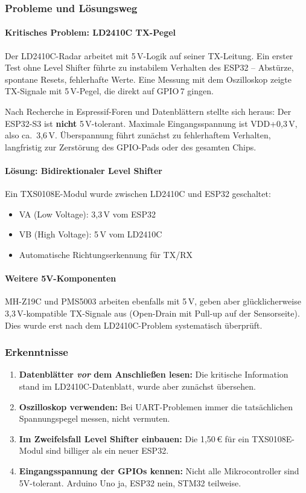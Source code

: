 \subsubsection{Probleme und Lösungsweg}

\paragraph{Kritisches Problem: LD2410C TX-Pegel}
Der LD2410C-Radar arbeitet mit 5\,V-Logik auf seiner TX-Leitung. Ein erster Test ohne Level Shifter führte zu instabilem Verhalten des ESP32 -- Abstürze, spontane Resets, fehlerhafte Werte. Eine Messung mit dem Oszilloskop zeigte TX-Signale mit 5\,V-Pegel, die direkt auf GPIO\,7 gingen.

Nach Recherche in Espressif-Foren und Datenblättern stellte sich heraus: Der ESP32-S3 ist \textbf{nicht} 5\,V-tolerant. Maximale Eingangsspannung ist VDD+0,3\,V, also ca.\ 3,6\,V. Überspannung führt zunächst zu fehlerhaftem Verhalten, langfristig zur Zerstörung des GPIO-Pads oder des gesamten Chips.

\paragraph{Lösung: Bidirektionaler Level Shifter}
Ein TXS0108E-Modul wurde zwischen LD2410C und ESP32 geschaltet:
\begin{itemize}[nosep]
\item VA (Low Voltage): 3,3\,V vom ESP32
\item VB (High Voltage): 5\,V vom LD2410C
\item Automatische Richtungserkennung für TX/RX
\end{itemize}

\paragraph{Weitere 5V-Komponenten}
MH-Z19C und PMS5003 arbeiten ebenfalls mit 5\,V, geben aber glücklicherweise 3,3\,V-kompatible TX-Signale aus (Open-Drain mit Pull-up auf der Sensorseite). Dies wurde erst nach dem LD2410C-Problem systematisch überprüft.

\subsubsection{Erkenntnisse}

\begin{enumerate}[nosep]
\item \textbf{Datenblätter \textit{vor} dem Anschließen lesen:} Die kritische Information stand im LD2410C-Datenblatt, wurde aber zunächst übersehen.
\item \textbf{Oszilloskop verwenden:} Bei UART-Problemen immer die tatsächlichen Spannungspegel messen, nicht vermuten.
\item \textbf{Im Zweifelsfall Level Shifter einbauen:} Die 1,50\,\euro{} für ein TXS0108E-Modul sind billiger als ein neuer ESP32.
\item \textbf{Eingangsspannung der GPIOs kennen:} Nicht alle Mikrocontroller sind 5V-tolerant. Arduino Uno ja, ESP32 nein, STM32 teilweise.
\end{enumerate}


